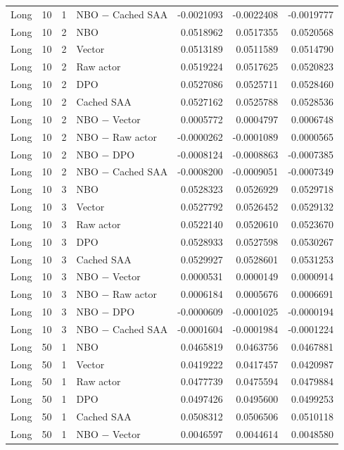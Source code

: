 \begin{longtable}{llrlrrr}
Long & 10 & 1 & NBO $-$ Cached SAA & -0.0021093 & -0.0022408 & -0.0019777 \\
Long & 10 & 2 & NBO & 0.0518962 & 0.0517355 & 0.0520568 \\
Long & 10 & 2 & Vector & 0.0513189 & 0.0511589 & 0.0514790 \\
Long & 10 & 2 & Raw actor & 0.0519224 & 0.0517625 & 0.0520823 \\
Long & 10 & 2 & DPO & 0.0527086 & 0.0525711 & 0.0528460 \\
Long & 10 & 2 & Cached SAA & 0.0527162 & 0.0525788 & 0.0528536 \\
Long & 10 & 2 & NBO $-$ Vector & 0.0005772 & 0.0004797 & 0.0006748 \\
Long & 10 & 2 & NBO $-$ Raw actor & -0.0000262 & -0.0001089 & 0.0000565 \\
Long & 10 & 2 & NBO $-$ DPO & -0.0008124 & -0.0008863 & -0.0007385 \\
Long & 10 & 2 & NBO $-$ Cached SAA & -0.0008200 & -0.0009051 & -0.0007349 \\
Long & 10 & 3 & NBO & 0.0528323 & 0.0526929 & 0.0529718 \\
Long & 10 & 3 & Vector & 0.0527792 & 0.0526452 & 0.0529132 \\
Long & 10 & 3 & Raw actor & 0.0522140 & 0.0520610 & 0.0523670 \\
Long & 10 & 3 & DPO & 0.0528933 & 0.0527598 & 0.0530267 \\
Long & 10 & 3 & Cached SAA & 0.0529927 & 0.0528601 & 0.0531253 \\
Long & 10 & 3 & NBO $-$ Vector & 0.0000531 & 0.0000149 & 0.0000914 \\
Long & 10 & 3 & NBO $-$ Raw actor & 0.0006184 & 0.0005676 & 0.0006691 \\
Long & 10 & 3 & NBO $-$ DPO & -0.0000609 & -0.0001025 & -0.0000194 \\
Long & 10 & 3 & NBO $-$ Cached SAA & -0.0001604 & -0.0001984 & -0.0001224 \\
Long & 50 & 1 & NBO & 0.0465819 & 0.0463756 & 0.0467881 \\
Long & 50 & 1 & Vector & 0.0419222 & 0.0417457 & 0.0420987 \\
Long & 50 & 1 & Raw actor & 0.0477739 & 0.0475594 & 0.0479884 \\
Long & 50 & 1 & DPO & 0.0497426 & 0.0495600 & 0.0499253 \\
Long & 50 & 1 & Cached SAA & 0.0508312 & 0.0506506 & 0.0510118 \\
Long & 50 & 1 & NBO $-$ Vector & 0.0046597 & 0.0044614 & 0.0048580 \\

\end{longtable}
